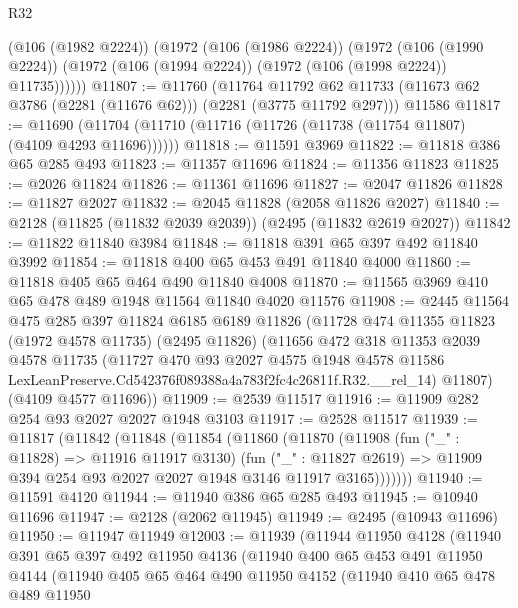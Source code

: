 \begin{lexlean}{R32}
\begin{coremodule}
        (@106 (@1982 @2224))
        (@1972
          (@106 (@1986 @2224))
          (@1972
            (@106 (@1990 @2224))
            (@1972 (@106 (@1994 @2224)) (@1972 (@106 (@1998 @2224)) @11735))))))
@11807 := @11760
    (@11764 @11792 @62 @11733 (@11673 @62 @3786 (@2281 (@11676 @62))) (@2281 (@3775 @11792 @297)))
    @11586
@11817 := @11690 (@11704 (@11710 (@11716 (@11726 (@11738 (@11754 @11807) (@4109 @4293 @11696))))))
@11818 := @11591 @3969
@11822 := @11818 @386 @65 @285 @493
@11823 := @11357 @11696
@11824 := @11356 @11823
@11825 := @2026 @11824
@11826 := @11361 @11696
@11827 := @2047 @11826
@11828 := @11827 @2027
@11832 := @2045 @11828 (@2058 @11826 @2027)
@11840 := @2128 (@11825 (@11832 @2039 @2039)) (@2495 (@11832 @2619 @2027))
@11842 := @11822 @11840 @3984
@11848 := @11818 @391 @65 @397 @492 @11840 @3992
@11854 := @11818 @400 @65 @453 @491 @11840 @4000
@11860 := @11818 @405 @65 @464 @490 @11840 @4008
@11870 := @11565 @3969 @410 @65 @478 @489 @1948 @11564 @11840 @4020 @11576
@11908 := @2445
    @11564
    @475
    @285
    @397
    @11824
    @6185
    @6189
    @11826
    (@11728
      @474
      @11355
      @11823
      (@1972 @4578 @11735)
      (@2495 @11826)
      (@11656
        @472
        @318
        @11353
        @2039
        @4578
        @11735
        (@11727
          @470
          @93
          @2027
          @4575
          @1948
          @4578
          @11586
          LexLeanPreserve.Cd542376f089388a4a783f2fc4c26811f.R32.__rel_14)
        @11807)
      (@4109 @4577 @11696))
@11909 := @2539 @11517
@11916 := @11909 @282 @254 @93 @2027 @2027 @1948 @3103
@11917 := @2528 @11517
@11939 := @11817
    (@11842
      (@11848
        (@11854
          (@11860
            (@11870
              (@11908
                (fun ("_" : @11828) => @11916 @11917 @3130)
                (fun ("_" : @11827 @2619) =>
                @11909 @394 @254 @93 @2027 @2027 @1948 @3146 @11917 @3165)))))))
@11940 := @11591 @4120
@11944 := @11940 @386 @65 @285 @493
@11945 := @10940 @11696
@11947 := @2128 (@2062 @11945)
@11949 := @2495 (@10943 @11696)
@11950 := @11947 @11949
@12003 := @11939
    (@11944
      @11950
      @4128
      (@11940
        @391
        @65
        @397
        @492
        @11950
        @4136
        (@11940
          @400
          @65
          @453
          @491
          @11950
          @4144
          (@11940
            @405
            @65
            @464
            @490
            @11950
            @4152
            (@11940
              @410
              @65
              @478
              @489
              @11950

\end{coremodule}
\end{lexlean}
